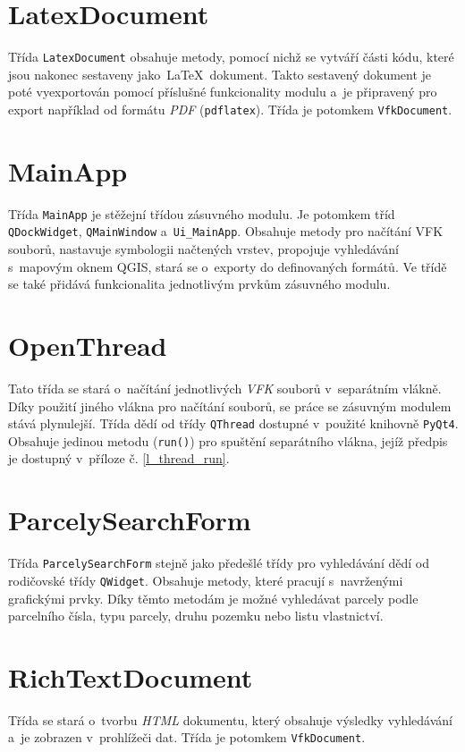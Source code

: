 \documentclass[a4paper,12pt,oneside]{book}
\newcommand{\latex}{\LaTeX}
\begin{document}
\section{LatexDocument}
Třída \texttt{LatexDocument} obsahuje metody, pomocí nichž se vytváří
části kódu, které jsou nakonec sestaveny jako~\latex~dokument. Takto
sestavený dokument je poté vyexportován pomocí příslušné funkcionality
modulu a~je připravený pro export například od formátu \textit{PDF}
(\texttt{pdflatex}). Třída je potomkem \texttt{VfkDocument}.

\section{MainApp}
Třída \texttt{MainApp} je stěžejní třídou zásuvného modulu. Je
potomkem tříd \texttt{QDockWidget}, \texttt{QMainWindow}
a~\texttt{Ui\_MainApp}. Obsahuje metody pro načítání VFK souborů,
nastavuje symbologii načtených vrstev, propojuje vyhledávání s~mapovým
oknem QGIS, stará se o~exporty do definovaných formátů. Ve třídě se
také přidává funkcionalita jednotlivým prvkům zásuvného modulu.

\section{OpenThread}
Tato třída se stará o~načítání jednotlivých \textit{VFK} souborů
v~separátním vlákně. Díky použití jiného vlákna pro načítání souborů,
se práce se zásuvným modulem stává plynulejší. Třída dědí od třídy
\texttt{QThread} dostupné v~použité knihovně \texttt{PyQt4}. Obsahuje
jedinou metodu (\texttt{run()}) pro spuštění separátního vlákna,
jejíž předpis je dostupný v~příloze č. \ref{l_thread_run}.

\section{ParcelySearchForm}
Třída \texttt{ParcelySearchForm} stejně jako předešlé třídy pro
vyhledávání dědí od rodičovské třídy \texttt{QWidget}. Obsahuje
metody, které pracují s~navrženými grafickými prvky. Díky těmto
metodám je možné vyhledávat parcely podle parcelního čísla, typu
parcely, druhu pozemku nebo listu vlastnictví.

\section{RichTextDocument}
Třída se stará o~tvorbu \textit{HTML} dokumentu, který obsahuje
výsledky vyhledávání a~je zobrazen v~prohlížeči dat. Třída je potomkem
\texttt{VfkDocument}.
\end{document}
